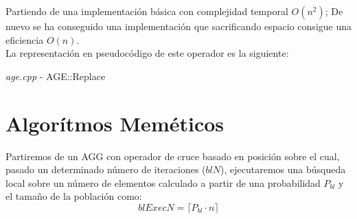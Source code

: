 \documentclass[a4paper, 12pt]{article}
\begin{document}
      Partiendo de una implementación básica con complejidad temporal $O(n^2)$; De nuevo se ha conseguido una implementación que sacrificando espacio consigue una eficiencia $O(n)$. \\
      
      La representación en pseudocódigo de este operador es la siguiente:\\
      
      \begin{algorithm}[H]
       	\caption{\textit{age.cpp} - AGE::Replace}
       	
      \end{algorithm}
      
      
      
      
      \newpage
      \section{Algorítmos Meméticos}
      Partiremos de un AGG con operador de cruce basado en posición sobre el cual, pasado un determinado número de iteraciones ($blN$), ejecutaremos una búsqueda local sobre un número de elementos calculado a partir de una probabilidad $P_{bl}$ y el tamaño de la población como:\\
      $$blExecN = \lceil P_{bl} \cdot n \rceil$$
      
\end{document}
